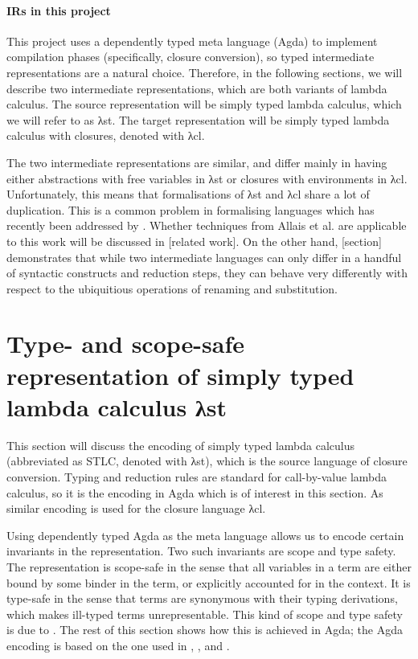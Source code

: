 \documentclass[bsc,frontabs,oneside,singlespacing,parskip,deptreport]{infthesis}
\theoremstyle{definition}
\theoremstyle{lemma}
\begin{document}
\paragraph{IRs in this project} This project uses a dependently typed
meta language (Agda) to implement compilation phases (specifically,
closure conversion), so typed intermediate representations are a
natural choice. Therefore, in the following sections, we will describe
two intermediate representations, which are both variants of lambda
calculus. The source representation will be simply typed lambda
calculus, which we will refer to as λst. The target
representation will be simply typed lambda calculus with closures,
denoted with λcl.

The two intermediate representations are similar, and differ mainly in
having either abstractions with free variables in λst or closures with
environments in λcl. Unfortunately, this means that formalisations of
λst and λcl share a lot of duplication. This is a common problem in
formalising languages which has recently been addressed by
\cite{DBLP:journals/pacmpl/AllaisA0MM18}. Whether techniques from
Allais et al. are applicable to this work will be discussed in [related
work]. On the other hand, [section] demonstrates that while two
intermediate languages can only differ in a handful of syntactic
constructs and reduction steps, they can behave very differently with
respect to the ubiquitious operations of renaming and substitution.

\section{Type- and scope-safe representation of simply typed lambda
  calculus λst}

This section will discuss the encoding of simply typed lambda calculus
(abbreviated as STLC, denoted with λst), which is the source language
of closure conversion. Typing and reduction rules are standard for
call-by-value lambda calculus, so it is the encoding in Agda which is
of interest in this section. As similar encoding is used for the
closure language λcl.

Using dependently typed Agda as the meta language allows us to encode
certain invariants in the representation. Two such invariants are
scope and type safety. The representation is scope-safe in the sense
that all variables in a term are either bound by some binder in the
term, or explicitly accounted for in the context. It is type-safe in
the sense that terms are synonymous with their typing derivations,
which makes ill-typed terms unrepresentable. This kind of scope and
type safety is due to \cite{DBLP:conf/csl/AltenkirchR99}. The rest of
this section shows how this is achieved in Agda; the Agda encoding is
based on the one used in \cite{DBLP:conf/cpp/Allais0MM17},
\cite{DBLP:journals/pacmpl/AllaisA0MM18}, and
\cite{DBLP:conf/sbmf/Wadler18}.
\end{document}
